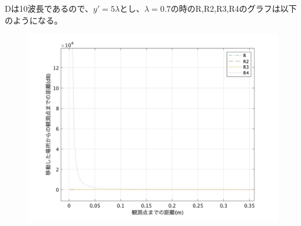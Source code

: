 \documentclass[dvipdfmx,autodetect-engine,titlepage]{jsarticle}
\begin{document}
Dは10波長であるので、\begin{math} y'=5\lambda\end{math}とし、\begin{math}
  \lambda = 0.7\end{math}の時のR,R2,R3,R4のグラフは以下のようになる。
\begin{figure}[h]
  \centering
  \includegraphics[scale=0.3]{week4_4.jpg}
  \caption{}
\end{figure}
\end{document}
